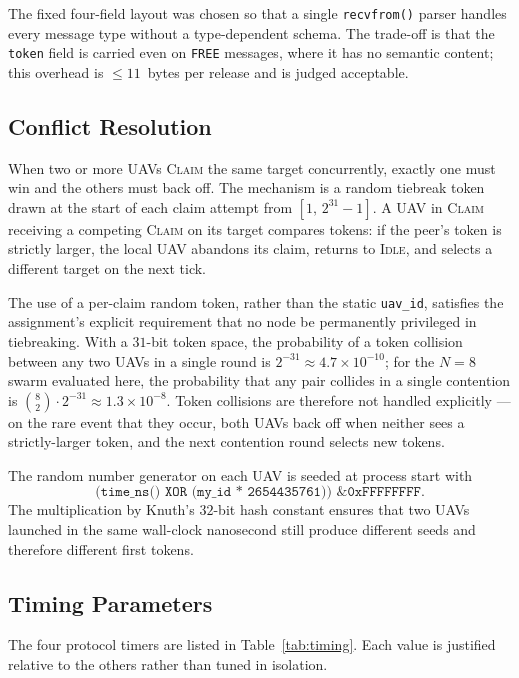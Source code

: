 \documentclass[11pt,letterpaper]{article}
\begin{document}
The fixed four-field layout was chosen so that a single
\texttt{recvfrom()} parser handles every message type without a
type-dependent schema. The trade-off is that the \texttt{token} field
is carried even on \texttt{FREE} messages, where it has no semantic
content; this overhead is $\leq 11$~bytes per release and is judged
acceptable.

\subsection{Conflict Resolution}
\label{sec:conflict}

When two or more UAVs \textsc{Claim} the same target concurrently,
exactly one must win and the others must back off. The mechanism is a
random tiebreak token drawn at the start of each claim attempt from
$[1,\,2^{31}-1]$. A UAV in \textsc{Claim} receiving a competing
\textsc{Claim} on its target compares tokens: if the peer's token is
strictly larger, the local UAV abandons its claim, returns to
\textsc{Idle}, and selects a different target on the next tick.

The use of a per-claim random token, rather than the static
\texttt{uav\_id}, satisfies the assignment's explicit requirement that
no node be permanently privileged in tiebreaking. With a $31$-bit token
space, the probability of a token collision between any two UAVs in a
single round is $2^{-31} \approx 4.7\!\times\!10^{-10}$; for the
$N\!=\!8$ swarm evaluated here, the probability that any pair collides
in a single contention is $\binom{8}{2}\!\cdot\!2^{-31} \approx
1.3\!\times\!10^{-8}$. Token collisions are therefore not handled
explicitly --- on the rare event that they occur, both UAVs back off
when neither sees a strictly-larger token, and the next contention
round selects new tokens.

The random number generator on each UAV is seeded at process start with
\[
\texttt{(time\_ns() XOR (my\_id * 2654435761)) \& 0xFFFFFFFF}.
\]
The multiplication by Knuth's $32$-bit hash constant ensures that two UAVs
launched in the same wall-clock nanosecond still produce different
seeds and therefore different first tokens.

\subsection{Timing Parameters}
\label{sec:timing}

The four protocol timers are listed in Table~\ref{tab:timing}. Each
value is justified relative to the others rather than tuned in
isolation.
\end{document}
